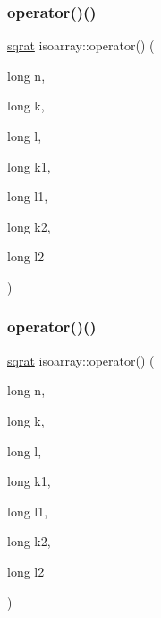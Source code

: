 \mbox{\label{classisoarray_a07114d3b1b8f125d169f10f81884ce16}} 
\subsubsection{\texorpdfstring{operator()()}{operator()()}\hspace{0.1cm}{\footnotesize\ttfamily [2/3]}}
{\footnotesize\ttfamily \mbox{\hyperlink{classsqrat}{sqrat}} isoarray\+::operator() (\begin{DoxyParamCaption}\item[{long}]{n,  }\item[{long}]{k,  }\item[{long}]{l,  }\item[{long}]{k1,  }\item[{long}]{l1,  }\item[{long}]{k2,  }\item[{long}]{l2 }\end{DoxyParamCaption})}

\mbox{\label{classisoarray_a07114d3b1b8f125d169f10f81884ce16}} 
\subsubsection{\texorpdfstring{operator()()}{operator()()}\hspace{0.1cm}{\footnotesize\ttfamily [3/3]}}
{\footnotesize\ttfamily \mbox{\hyperlink{classsqrat}{sqrat}} isoarray\+::operator() (\begin{DoxyParamCaption}\item[{long}]{n,  }\item[{long}]{k,  }\item[{long}]{l,  }\item[{long}]{k1,  }\item[{long}]{l1,  }\item[{long}]{k2,  }\item[{long}]{l2 }\end{DoxyParamCaption})}

\mbox{\label{classisoarray_a6af30a576928cf3005c5c6464e64b70e}} 
